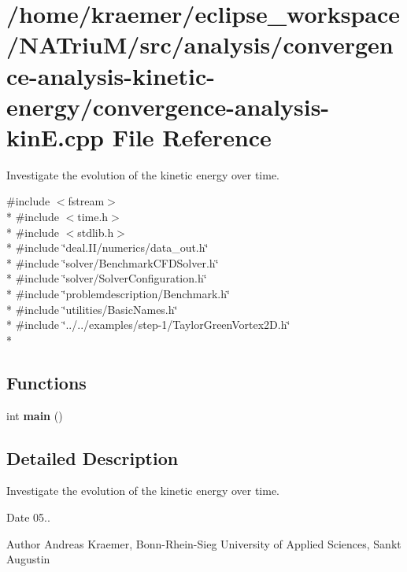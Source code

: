 \hypertarget{convergence-analysis-kinE_8cpp}{\section{/home/kraemer/eclipse\-\_\-workspace/\-N\-A\-Triu\-M/src/analysis/convergence-\/analysis-\/kinetic-\/energy/convergence-\/analysis-\/kin\-E.cpp File Reference}
\label{convergence-analysis-kinE_8cpp}
}


Investigate the evolution of the kinetic energy over time.  


{\ttfamily \#include $<$fstream$>$}\\*
{\ttfamily \#include $<$time.\-h$>$}\\*
{\ttfamily \#include $<$stdlib.\-h$>$}\\*
{\ttfamily \#include \char`\"{}deal.\-I\-I/numerics/data\-\_\-out.\-h\char`\"{}}\\*
{\ttfamily \#include \char`\"{}solver/\-Benchmark\-C\-F\-D\-Solver.\-h\char`\"{}}\\*
{\ttfamily \#include \char`\"{}solver/\-Solver\-Configuration.\-h\char`\"{}}\\*
{\ttfamily \#include \char`\"{}problemdescription/\-Benchmark.\-h\char`\"{}}\\*
{\ttfamily \#include \char`\"{}utilities/\-Basic\-Names.\-h\char`\"{}}\\*
{\ttfamily \#include \char`\"{}../../examples/step-\/1/\-Taylor\-Green\-Vortex2\-D.\-h\char`\"{}}\\*
\subsection*{Functions}
\begin{DoxyCompactItemize}
\item 
\hypertarget{convergence-analysis-kinE_8cpp_ae66f6b31b5ad750f1fe042a706a4e3d4}{int {\bfseries main} ()}\label{convergence-analysis-kinE_8cpp_ae66f6b31b5ad750f1fe042a706a4e3d4}

\end{DoxyCompactItemize}


\subsection{Detailed Description}
Investigate the evolution of the kinetic energy over time. \begin{DoxyDate}{Date}
05.. 
\end{DoxyDate}
\begin{DoxyAuthor}{Author}
Andreas Kraemer, Bonn-\/\-Rhein-\/\-Sieg University of Applied Sciences, Sankt Augustin 
\end{DoxyAuthor}
